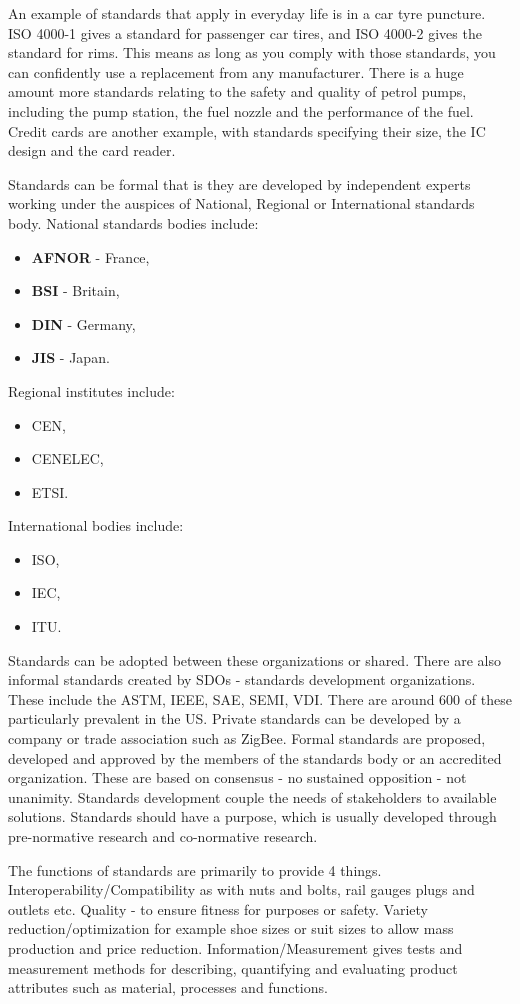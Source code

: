 An example of standards that apply in everyday life is in a car tyre puncture. 
ISO 4000-1 gives a standard for passenger car tires, and ISO 4000-2 gives the standard for rims. 
This means as long as you comply with those standards, you can confidently use a replacement from any manufacturer. 
There is a huge amount more standards relating to the safety and quality of petrol pumps, including the pump station, the fuel nozzle and the performance of the fuel. 
Credit cards are another example, with standards specifying their size, the IC design and the card reader.

Standards can be formal that is they are developed by independent experts working under the auspices of National, Regional or International standards body. 
National standards bodies include:
\begin{itemize}
\item \textbf{AFNOR} - France, 
\item \textbf{BSI} - Britain, 
\item \textbf{DIN} - Germany, 
\item \textbf{JIS} - Japan. 
\end{itemize}
Regional institutes include:
\begin{itemize}
\item CEN, 
\item CENELEC, 
\item ETSI. 
\end{itemize}
International bodies include:
\begin{itemize}
\item ISO, 
\item IEC,
\item  ITU. 
\end{itemize}
Standards can be adopted between these organizations or shared. 
There are also informal standards created by SDOs - standards development organizations. 
These include the ASTM, IEEE, SAE, SEMI, VDI. 
There are around 600 of these particularly prevalent in the US. 
Private standards can be developed by a company or trade association such as ZigBee.
 Formal standards are proposed, developed and approved by the members of the standards body or an accredited organization. 
These are based on consensus - no sustained opposition - not unanimity. 
Standards development couple the needs of stakeholders to available solutions. 
Standards should have a purpose, which is usually developed through pre-normative research and co-normative research.

The functions of standards are primarily to provide 4 things. 
Interoperability/Compatibility as with nuts and bolts, rail gauges plugs and outlets etc. 
Quality - to ensure fitness for purposes or safety. 
Variety reduction/optimization for example shoe sizes or suit sizes to allow mass production and price reduction. 
Information/Measurement gives tests and measurement methods for describing, quantifying and evaluating product attributes such as material, processes and functions.

